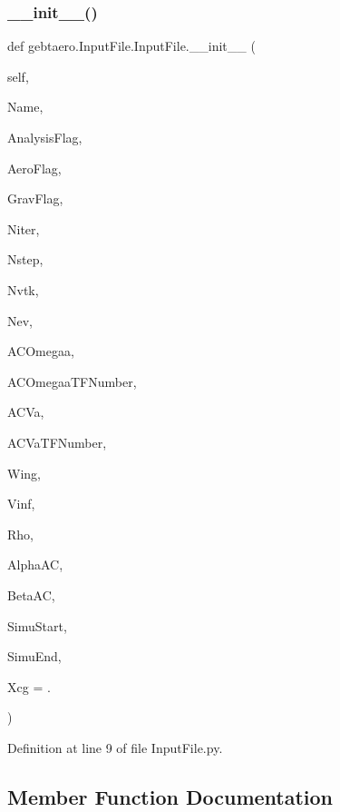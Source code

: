 \subsubsection{\texorpdfstring{\+\_\+\+\_\+init\+\_\+\+\_\+()}{\_\_init\_\_()}}
{\footnotesize\ttfamily def gebtaero.\+Input\+File.\+Input\+File.\+\_\+\+\_\+init\+\_\+\+\_\+ (\begin{DoxyParamCaption}\item[{}]{self,  }\item[{}]{Name,  }\item[{}]{Analysis\+Flag,  }\item[{}]{Aero\+Flag,  }\item[{}]{Grav\+Flag,  }\item[{}]{Niter,  }\item[{}]{Nstep,  }\item[{}]{Nvtk,  }\item[{}]{Nev,  }\item[{}]{A\+C\+Omegaa,  }\item[{}]{A\+C\+Omegaa\+T\+F\+Number,  }\item[{}]{A\+C\+Va,  }\item[{}]{A\+C\+Va\+T\+F\+Number,  }\item[{}]{Wing,  }\item[{}]{Vinf,  }\item[{}]{Rho,  }\item[{}]{Alpha\+AC,  }\item[{}]{Beta\+AC,  }\item[{}]{Simu\+Start,  }\item[{}]{Simu\+End,  }\item[{}]{Xcg = {.} }\end{DoxyParamCaption})}



Definition at line 9 of file Input\+File.\+py.



\subsection{Member Function Documentation}
\mbox{\label{classgebtaero_1_1_input_file_1_1_input_file_a3cf4d7178dc0471896e7c60f6c17e906}} 
